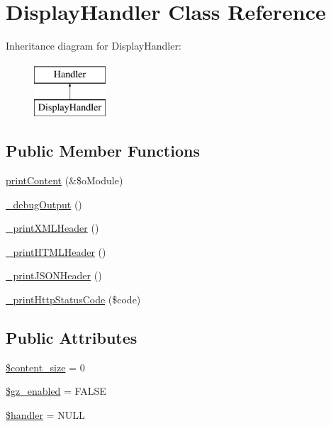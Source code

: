 \hypertarget{classDisplayHandler}{\section{Display\-Handler Class Reference}
\label{classDisplayHandler}
}
Inheritance diagram for Display\-Handler\-:\begin{figure}[H]
\begin{center}
\leavevmode
\includegraphics[height=2.000000cm]{classDisplayHandler}
\end{center}
\end{figure}
\subsection*{Public Member Functions}
\begin{DoxyCompactItemize}
\item 
\hyperlink{classDisplayHandler_a40cee7b6783514fb596d4e595e5fc0f7}{print\-Content} (\&\$o\-Module)
\item 
\hyperlink{classDisplayHandler_ade82618e903db5607dbc311f87f997f7}{\-\_\-debug\-Output} ()
\item 
\hyperlink{classDisplayHandler_ac1f3197b7ada7152aacf72730f34571b}{\-\_\-print\-X\-M\-L\-Header} ()
\item 
\hyperlink{classDisplayHandler_abbeb865d70e224403e99570c50d37f1b}{\-\_\-print\-H\-T\-M\-L\-Header} ()
\item 
\hyperlink{classDisplayHandler_a62dd794125b2c76780ffdb9615abbb32}{\-\_\-print\-J\-S\-O\-N\-Header} ()
\item 
\hyperlink{classDisplayHandler_a1cdc46d8bb9a6dce319ecdc664c5748c}{\-\_\-print\-Http\-Status\-Code} (\$code)
\end{DoxyCompactItemize}
\subsection*{Public Attributes}
\begin{DoxyCompactItemize}
\item 
\hyperlink{classDisplayHandler_a16976f3c3f4d8e587c113278731a5562}{\$content\-\_\-size} = 0
\item 
\hyperlink{classDisplayHandler_a15d342938e38ae003b61d9437a43d3dc}{\$gz\-\_\-enabled} = F\-A\-L\-S\-E
\item 
\hyperlink{classDisplayHandler_a5bba2765a13e36d9e147424338fb2a92}{\$handler} = N\-U\-L\-L
\end{DoxyCompactItemize}


